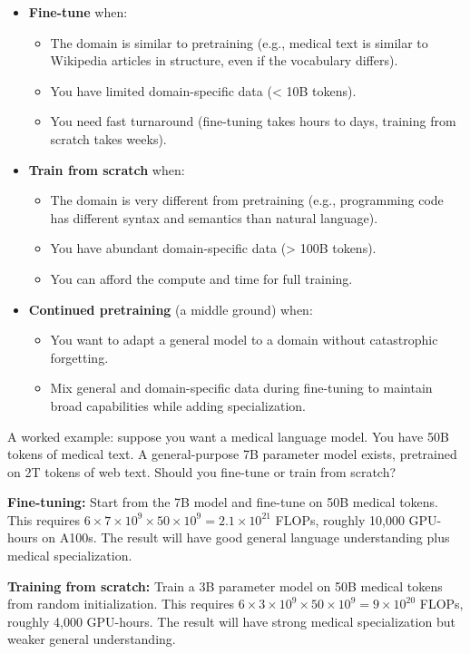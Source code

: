 \begin{itemize}
\item \textbf{Fine-tune} when:
  \begin{itemize}
  \item The domain is similar to pretraining (e.g., medical text is similar to Wikipedia articles in structure, even if the vocabulary differs).
  \item You have limited domain-specific data (< 10B tokens).
  \item You need fast turnaround (fine-tuning takes hours to days, training from scratch takes weeks).
  \end{itemize}

\item \textbf{Train from scratch} when:
  \begin{itemize}
  \item The domain is very different from pretraining (e.g., programming code has different syntax and semantics than natural language).
  \item You have abundant domain-specific data (> 100B tokens).
  \item You can afford the compute and time for full training.
  \end{itemize}

\item \textbf{Continued pretraining} (a middle ground) when:
  \begin{itemize}
  \item You want to adapt a general model to a domain without catastrophic forgetting.
  \item Mix general and domain-specific data during fine-tuning to maintain broad capabilities while adding specialization.
  \end{itemize}
\end{itemize}

A worked example: suppose you want a medical language model. You have 50B tokens of medical text. A general-purpose 7B parameter model exists, pretrained on 2T tokens of web text. Should you fine-tune or train from scratch?

\textbf{Fine-tuning:} Start from the 7B model and fine-tune on 50B medical tokens. This requires $6 \times 7 \times 10^9 \times 50 \times 10^9 = 2.1 \times 10^{21}$ FLOPs, roughly 10,000 GPU-hours on A100s. The result will have good general language understanding plus medical specialization.

\textbf{Training from scratch:} Train a 3B parameter model on 50B medical tokens from random initialization. This requires $6 \times 3 \times 10^9 \times 50 \times 10^9 = 9 \times 10^{20}$ FLOPs, roughly 4,000 GPU-hours. The result will have strong medical specialization but weaker general understanding.

